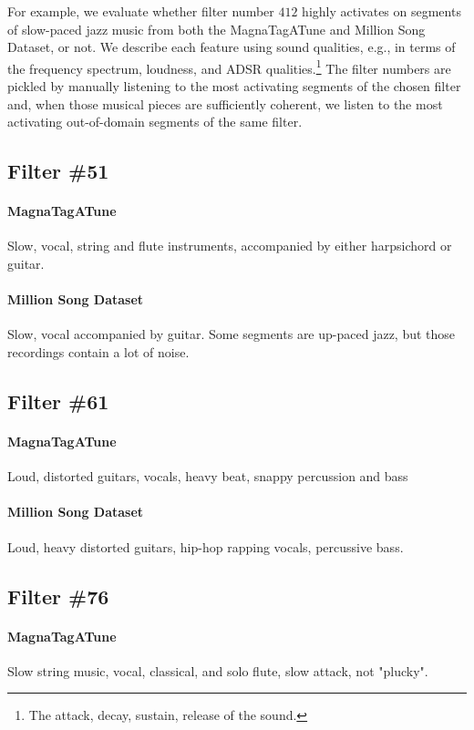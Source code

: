 For example, we evaluate whether filter number $412$ highly activates on segments of slow-paced jazz music from both the MagnaTagATune and Million Song Dataset, or not. We describe each feature using sound qualities, e.g., in terms of the frequency spectrum, loudness, and ADSR qualities.\footnote{The attack, decay, sustain, release of the sound.} The filter numbers are pickled by manually listening to the most activating segments of the chosen filter and, when those musical pieces are sufficiently coherent, we listen to the most activating out-of-domain segments of the same filter.

\subsection*{Filter \#51}
\paragraph{MagnaTagATune}
Slow, vocal, string and flute instruments, accompanied by either harpsichord or guitar.
\paragraph{Million Song Dataset}
Slow, vocal accompanied by guitar. Some segments are up-paced jazz, but those recordings contain a lot of noise.

\subsection*{Filter \#61}
\paragraph{MagnaTagATune}
Loud, distorted guitars, vocals, heavy beat, snappy percussion and bass
\paragraph{Million Song Dataset}
Loud, heavy distorted guitars, hip-hop rapping vocals, percussive bass.

\subsection*{Filter \#76}
\paragraph{MagnaTagATune}
Slow string music, vocal, classical, and solo flute, slow attack, not "plucky".


